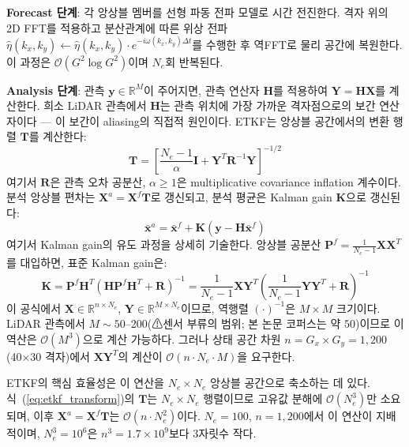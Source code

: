 \documentclass[11pt]{report}
\numberwithin{equation}{chapter}
\numberwithin{figure}{chapter}
\numberwithin{table}{chapter}
\begin{document}
\textbf{Forecast 단계}: 각 앙상블 멤버를 선형 파동 전파 모델로 시간 전진한다.
격자 위의 2D FFT를 적용하고 분산관계에 따른
위상 전파 $\hat{\eta}(k_x, k_y) \leftarrow \hat{\eta}(k_x, k_y) \cdot
e^{-i\omega(k_x,k_y)\Delta t}$를 수행한 후 역FFT로 물리 공간에 복원한다.
이 과정은 $\mathcal{O}(G^2 \log G^2)$이며 $N_e$회 반복된다.

\textbf{Analysis 단계}: 관측 $\mathbf{y} \in \mathbb{R}^M$이 주어지면,
관측 연산자 $\mathbf{H}$를 적용하여 $\mathbf{Y} = \mathbf{H}\mathbf{X}$를 계산한다.
희소 LiDAR 관측에서 $\mathbf{H}$는 관측 위치에 가장 가까운 격자점으로의
보간 연산자이다 --- 이 보간이 aliasing의 직접적 원인이다.
ETKF는 앙상블 공간에서의 변환 행렬 $\mathbf{T}$를 계산한다:
\begin{equation}
  \mathbf{T} = \left[\frac{N_e - 1}{\alpha}\mathbf{I}
    + \mathbf{Y}^T \mathbf{R}^{-1} \mathbf{Y}\right]^{-1/2}
  \label{eq:etkf_transform}
\end{equation}
여기서 $\mathbf{R}$은 관측 오차 공분산, $\alpha \geq 1$은 multiplicative
covariance inflation 계수이다.
분석 앙상블 편차는 $\mathbf{X}^a = \mathbf{X}^f \mathbf{T}$로 갱신되고,
분석 평균은 Kalman gain $\mathbf{K}$으로 갱신된다:
\begin{equation}
  \bar{\mathbf{x}}^a = \bar{\mathbf{x}}^f + \mathbf{K}(\mathbf{y} - \mathbf{H}\bar{\mathbf{x}}^f)
  \label{eq:etkf_mean}
\end{equation}
여기서 Kalman gain의 유도 과정을 상세히 기술한다.
앙상블 공분산 $\mathbf{P}^f = \frac{1}{N_e-1}\mathbf{X}\mathbf{X}^T$를 대입하면,
표준 Kalman gain은:
\begin{equation}
  \mathbf{K} = \mathbf{P}^f\mathbf{H}^T(\mathbf{H}\mathbf{P}^f\mathbf{H}^T + \mathbf{R})^{-1}
  = \frac{1}{N_e-1}\mathbf{X}\mathbf{Y}^T\left(\frac{1}{N_e-1}\mathbf{Y}\mathbf{Y}^T + \mathbf{R}\right)^{-1}
  \label{eq:kalman_gain}
\end{equation}
이 공식에서 $\mathbf{X} \in \mathbb{R}^{n \times N_e}$, $\mathbf{Y} \in \mathbb{R}^{M \times N_e}$이므로,
역행렬 $(\cdot)^{-1}$은 $M \times M$ 크기이다.
LiDAR 관측에서 $M \sim 50$--200(⚠센서 부류의 범위; 본 논문 코퍼스는 약 $50$)이므로
이 역산은 $\mathcal{O}(M^3)$으로 계산 가능하다.
그러나 상태 공간 차원 $n = G_x \times G_y = 1{,}200$ (40$\times$30 격자)에서
$\mathbf{X}\mathbf{Y}^T$의 계산이 $\mathcal{O}(n \cdot N_e \cdot M)$을 요구한다.

ETKF의 핵심 효율성은 이 연산을 $N_e \times N_e$ 앙상블 공간으로 축소하는 데 있다.
식~(\ref{eq:etkf_transform})의 $\mathbf{T}$는 $N_e \times N_e$ 행렬이므로
고유값 분해에 $\mathcal{O}(N_e^3)$만 소요되며,
이후 $\mathbf{X}^a = \mathbf{X}^f\mathbf{T}$는 $\mathcal{O}(n \cdot N_e^2)$이다.
$N_e = 100$, $n = 1{,}200$에서 이 연산이 지배적이며,
$N_e^3 = 10^6$은 $n^3 = 1.7 \times 10^9$보다 3자릿수 작다.
\end{document}
